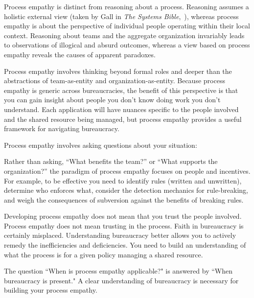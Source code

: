 Process empathy is distinct from reasoning about a process. Reasoning assumes a holistic external view (taken by Gall in \textit{The Systems Bible},~\cite{2002_Gall}), whereas process empathy is about the perspective of individual people operating within their local context. Reasoning about teams and the aggregate organization invariably leads to observations of illogical and absurd outcomes, whereas a view based on process empathy reveals the causes of apparent paradoxes.

Process empathy involves thinking beyond formal roles and deeper than the abstractions of team-as-entity and organization-as-entity. 
Because process empathy is generic across bureaucracies, the benefit of this perspective is that you can gain insight about people you don't know doing work you don't understand.
Each application will have nuances specific to the people involved and the shared resource being managed, but process empathy provides a useful framework for navigating bureaucracy.


Process empathy involves asking questions about your situation:

Rather than asking, ``What benefits the team?'' or ``What supports the organization?'' the paradigm of process empathy focuses on people and incentives. %
For example, to be effective you need to 
identify rules (written and unwritten), determine who enforces what, consider the detection mechanics for rule-breaking, and weigh the consequences of subversion against the benefits of breaking rules.

Developing process empathy does not mean that you trust the people involved. Process empathy does not mean trusting in the process. Faith in bureaucracy is certainly misplaced. Understanding bureaucracy better allows you to actively remedy the inefficiencies and deficiencies. 
You need to build an understanding of what the process is for a given policy managing a \gls{shared resource}. 

The question ``When is process empathy applicable?" is answered by ``When bureaucracy is present." A clear understanding of bureaucracy is necessary for building your process empathy.
